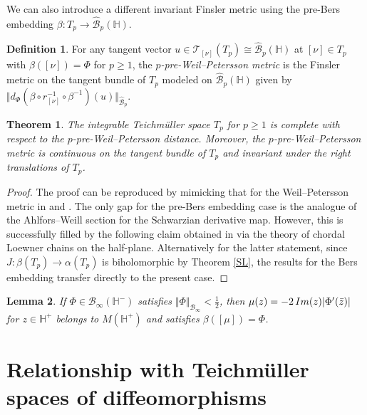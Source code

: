 \documentclass[amstex,12pt,reqno]{amsart}
\newtheorem{theorem}{Theorem}[section]
\newtheorem{lemma}[theorem]{Lemma}
\theoremstyle{definition}
\newtheorem{definition}{Definition}
\begin{document}
We can also introduce a different invariant Finsler metric using 
the pre-Bers embedding $\beta:T_p \to \widehat{\mathcal B}_p(\mathbb H)$.

\begin{definition}
For any tangent vector $u \in {\mathscr T}_{[\nu]}(T_p) \cong \widehat{\mathcal B}_p(\mathbb H)$ at $[\nu] \in T_p$ 
with $\beta([\nu])=\Phi$ for $p \geq 1$,
the {\it $p$-pre-Weil--Petersson metric} is the Finsler metric 
on the tangent bundle of $T_p$ modeled on
$\widehat{\mathcal B}_p(\mathbb H)$ given by 
$\Vert d_\Phi(\beta \circ r_{[\nu]}^{-1} \circ \beta^{-1})(u) \Vert_{\widehat{\mathcal B}_p}$.
\end{definition}

\begin{theorem}\label{complete}
The integrable Teich\-m\"ul\-ler space $T_p$ for $p \geq 1$ is complete with respect to 
the $p$-pre-Weil--Petersson distance. Moreover, 
the $p$-pre-Weil--Petersson metric is continuous on the tangent bundle of $T_p$ and invariant under the
right translations of $T_p$.
\end{theorem}

\begin{proof}
The proof can be reproduced by mimicking that for the Weil--Petersson metric in
\cite[Theorem 5]{Cu} and \cite[Section 8]{Ma1}.
The only gap for the pre-Bers embedding case is the analogue of the Ahlfors--Weill section
for the Schwarzian derivative map. However, this is successfully filled by
the following claim obtained in \cite[Theorem 5.1]{GH} via the theory of chordal Loewner chains on the half-plane.
Alternatively for the latter statement, since $J:\beta(T_p) \to \alpha(T_p)$ is biholomorphic by Theorem \ref{SL}, 
the results for the Bers embedding transfer directly to the present case.
\end{proof}

\begin{lemma}
If $\Phi \in {\mathcal B}_\infty(\mathbb H^-)$ satisfies $\Vert \Phi \Vert_{{\mathcal B}_\infty}<\tfrac12$,
then $\mu(z)=-2\,{\rm Im}(z)|\Phi'(\bar z)|$ for $z \in \mathbb H^+$
belongs to $M(\mathbb H^+)$ and satisfies $\beta([\mu])=\Phi$.
\end{lemma}



\section{Relationship with Teich\-m\"ul\-ler spaces of diffeomorphisms}\label{6}
\end{document}
